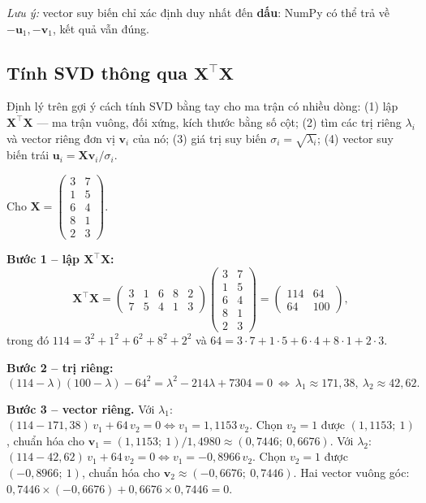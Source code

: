 \noindent\textit{Lưu ý:} vector suy biến chỉ xác định duy nhất đến \textbf{dấu}: NumPy có thể trả về $-\mathbf{u}_1, -\mathbf{v}_1$, kết quả vẫn đúng.

\subsection{Tính SVD thông qua $\mathbf{X}^\top\mathbf{X}$}

Định lý trên gợi ý cách tính SVD bằng tay cho ma trận có nhiều dòng: (1) lập $\mathbf{X}^\top\mathbf{X}$ --- ma trận vuông, đối xứng, kích thước bằng số cột; (2) tìm các trị riêng $\lambda_i$ và vector riêng đơn vị $\mathbf{v}_i$ của nó; (3) giá trị suy biến $\sigma_i = \sqrt{\lambda_i}$; (4) vector suy biến trái $\mathbf{u}_i = \mathbf{X}\mathbf{v}_i / \sigma_i$.

\begin{example}
Cho $\mathbf{X} = \begin{pmatrix} 3 & 7 \\ 1 & 5 \\ 6 & 4 \\ 8 & 1 \\ 2 & 3 \end{pmatrix}$.
\end{example}

\noindent\textbf{Bước 1 -- lập $\mathbf{X}^\top\mathbf{X}$:}
\[
    \mathbf{X}^\top\mathbf{X} = \begin{pmatrix} 3 & 1 & 6 & 8 & 2 \\ 7 & 5 & 4 & 1 & 3 \end{pmatrix}
    \begin{pmatrix} 3 & 7 \\ 1 & 5 \\ 6 & 4 \\ 8 & 1 \\ 2 & 3 \end{pmatrix}
    = \begin{pmatrix} 114 & 64 \\ 64 & 100 \end{pmatrix},
\]
trong đó $114 = 3^2 + 1^2 + 6^2 + 8^2 + 2^2$ và $64 = 3 \cdot 7 + 1 \cdot 5 + 6 \cdot 4 + 8 \cdot 1 + 2 \cdot 3$.

\noindent\textbf{Bước 2 -- trị riêng:}
\[
    (114 - \lambda)(100 - \lambda) - 64^2 = \lambda^2 - 214\lambda + 7304 = 0
    \ \Leftrightarrow\ \lambda_1 \approx 171{,}38,\ \lambda_2 \approx 42{,}62 .
\]

\noindent\textbf{Bước 3 -- vector riêng.} Với $\lambda_1$: $(114 - 171{,}38)\,v_1 + 64\,v_2 = 0 \Leftrightarrow v_1 = 1{,}1153\,v_2$. Chọn $v_2 = 1$ được $(1{,}1153;\ 1)$, chuẩn hóa cho $\mathbf{v}_1 = (1{,}1153;\ 1)/1{,}4980 \approx (0{,}7446;\ 0{,}6676)$. Với $\lambda_2$: $(114 - 42{,}62)\,v_1 + 64\,v_2 = 0 \Leftrightarrow v_1 = -0{,}8966\,v_2$. Chọn $v_2 = 1$ được $(-0{,}8966;\ 1)$, chuẩn hóa cho $\mathbf{v}_2 \approx (-0{,}6676;\ 0{,}7446)$. Hai vector vuông góc: $0{,}7446 \times (-0{,}6676) + 0{,}6676 \times 0{,}7446 = 0$.

